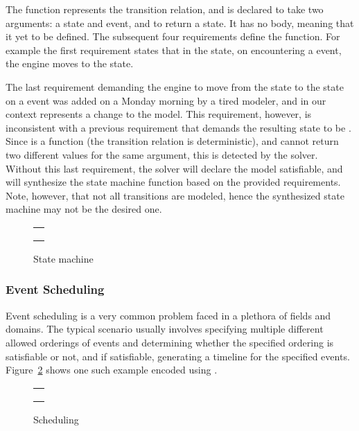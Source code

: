 The function  represents the transition relation, and is
declared to take two arguments: a state and event, and to return a
state.  It has no body, meaning that it yet to be defined. The
subsequent four requirements define the  function. For
example the first requirement states that in the  state, on
encountering a  event, the engine moves to the
 state.

The last requirement demanding the engine to move from the
 state to the  state on a  event was
added on a Monday morning by a tired modeler, and in our context
represents a change to the model.  This requirement, however, is
inconsistent with a previous requirement that demands the resulting
state to be .  Since  is a function (the
transition relation is deterministic), and cannot return two different
values for the same argument, this is detected by the solver.  Without
this last requirement, the solver will declare the model satisfiable,
and will synthesize the state machine function based on the provided
requirements.  Note, however, that not all transitions are modeled,
hence the synthesized state machine may not be the desired one.

\begin{figure}
\centering
\begin{tabular}{c}
\hline \\
 \\ \\
\hline
\end{tabular}
\caption{State machine}
\label{fig:statemachine}
\end{figure}

\subsubsection{Event Scheduling}

Event scheduling is a very common problem faced in a plethora of
fields and domains. The typical scenario usually involves specifying
multiple different allowed orderings of events and determining whether
the specified ordering is satisfiable or not, and if satisfiable,
generating a timeline for the specified events.
Figure~\ref{fig:scheduling} shows one such example encoded using
\Klang{}.

\begin{figure}
\centering
\begin{tabular}{c}
\hline \\
 \\ \\
\hline
\end{tabular}
\caption{Scheduling}
\label{fig:scheduling}
\end{figure}

